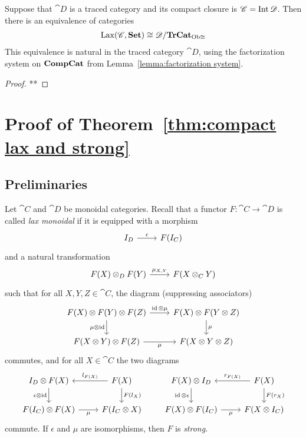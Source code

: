\documentclass[12pt,oneside,article,draft]{memoir}
\begin{document}
\begin{corollary}
Suppose that $\cat{D}$ is a traced category and its compact closure is $\mathscr{C}=\operatorname{Int}\mathscr{D}$. Then there is an equivalence of categories
\begin{align}\label{dia:traced lax strong}
\operatorname{Lax}(\mathscr{C},\mathbf{Set})\cong\mathscr{D}/\mathbf{TrCat}_{{\operatorname{Ob}\cong}}
\end{align}
This equivalence is natural in the traced category $\cat{D}$, using the factorization system on $\mathbf{CompCat}$ from Lemma~\ref{lemma:factorization system}.
\end{corollary}

\begin{proof}
**
\end{proof}



\chapter{Proof of Theorem~\ref{thm:compact lax and strong}}

\section{Preliminaries}

Let $\cat{C}$ and $\cat{D}$ be monoidal categories. Recall that a functor $F\colon\cat{C}\to\cat{D}$ is called \emph{lax monoidal} if it is equipped with a morphism
\[
\begin{tikzcd}
	I_D \rar{\epsilon} & F(I_C)
\end{tikzcd}
\]
and a natural transformation
\[
\begin{tikzcd}
	F(X) \otimes_D F(Y) \rar{\mu_{X,Y}} & F(X\otimes_C Y)
\end{tikzcd}
\]
such that for all $X,Y,Z\in\cat{C}$, the diagram (suppressing associators)
\[
\begin{tikzcd}
	F(X)\otimes F(Y) \otimes F(Z)
		\rar{\id\otimes\mu}
		\dar[swap]{\mu\otimes\id}
	& F(X)\otimes F(Y\otimes Z)
		\dar{\mu} \\
	F(X\otimes Y)\otimes F(Z)
		\rar[swap]{\mu}
	& F(X\otimes Y\otimes Z)
\end{tikzcd}
\]
commutes, and for all $X\in\cat{C}$ the two diagrams
\[
\begin{tikzcd}
	I_D\otimes F(X)
		\dar[swap]{\epsilon\otimes\id}
	& F(X)
		\lar[swap]{l_{F(X)}}
		\dar{F(l_X)} \\
	F(I_C)\otimes F(X)
		\rar[swap]{\mu}
	& F(I_C\otimes X)
\end{tikzcd}
\qquad
\begin{tikzcd}
	F(X) \otimes I_D
		\dar[swap]{\id\otimes\epsilon}
	& F(X)
		\lar[swap]{r_{F(X)}}
		\dar{F(r_X)} \\
	F(X)\otimes F(I_C)
		\rar[swap]{\mu}
	& F(X\otimes I_C)
\end{tikzcd}
\]
commute. If $\epsilon$ and $\mu$ are isomorphisms, then $F$ is \emph{strong}.
\end{document}
